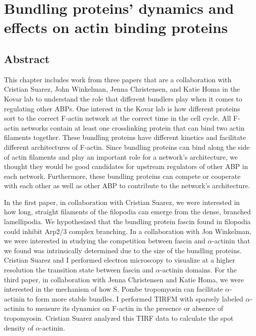 \chapter{Bundling proteins' dynamics and effects on actin binding proteins}\label{ch:abp-bundle}

\section[Abstract]{Abstract\footnotemark}

This chapter includes work from three papers that are a collaboration with Cristian Suarez, John Winkelman, Jenna Christensen, and Katie Homa in the Kovar lab to understand the role that different bundlers play when it comes to regulating other ABPs. One interest in the Kovar lab is how different proteins sort to the correct F-actin network at the correct time in the cell cycle. All F-actin networks contain at least one crosslinking protein that can bind two actin filaments together. These bundling proteins have different kinetics and facilitate different architectures of F-actin. Since bundling proteins can bind along the side of actin filaments and play an important role for a network's architecture, we thought they would be good candidates for upstream regulators of other ABP in each network. Furthermore, these bundling proteins can compete or cooperate with each other as well as other ABP to contribute to the network's architecture. 

In the first paper, in collaboration with Cristian Suarez, we were interested in how long, straight filaments of the filopodia can emerge from the dense, branched lamellipodia. We hypothesized that the bundling protein fascin found in filopodia could inhibit Arp2/3 complex branching. In a collaboration with Jon Winkelman, we were interested in studying the competition between fascin and $\alpha$-actinin that we found was intrinsically determined due to the size of the bundling proteins. Cristian Suarez and I performed electron microscopy to visualize at a higher resolution the transition state between fascin and $\alpha$-actinin domains. For the third paper, in collaboration with Jenna Christensen and Katie Homa, we were interested in the mechanism of how S. Pombe tropomyosin can facilitate $\alpha$-actinin to form more stable bundles. I performed TIRFM with sparsely labeled $\alpha$-actinin to measure its dynamics on F-actin in the presence or absence of tropomyosin. Cristian Suarez analyzed this TIRF data to calculate the spot density of $\alpha$-actinin.

